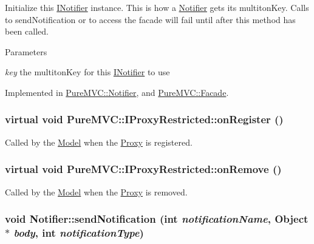 Initialize this \hyperlink{class_pure_m_v_c_1_1_i_notifier}{INotifier} instance. This is how a \hyperlink{class_pure_m_v_c_1_1_notifier}{Notifier} gets its multitonKey. Calls to sendNotification or to access the facade will fail until after this method has been called.


\begin{DoxyParams}{Parameters}
\item[{\em key}]the multitonKey for this \hyperlink{class_pure_m_v_c_1_1_i_notifier}{INotifier} to use \end{DoxyParams}


Implemented in \hyperlink{class_pure_m_v_c_1_1_notifier_a6910365c70415ba7973401215f57e4af}{PureMVC::Notifier}, and \hyperlink{class_pure_m_v_c_1_1_facade_a94c72ff29f9f42ff084f247b180fb4ad}{PureMVC::Facade}.\hypertarget{class_pure_m_v_c_1_1_i_proxy_restricted_a450f14bba0bde7c94e5868e844f1fdf2}{
\subsubsection[{onRegister}]{\setlength{\rightskip}{0pt plus 5cm}virtual void PureMVC::IProxyRestricted::onRegister ()}}
\label{class_pure_m_v_c_1_1_i_proxy_restricted_a450f14bba0bde7c94e5868e844f1fdf2}


Called by the \hyperlink{class_pure_m_v_c_1_1_model}{Model} when the \hyperlink{class_pure_m_v_c_1_1_proxy}{Proxy} is registered. \hypertarget{class_pure_m_v_c_1_1_i_proxy_restricted_a6d883fcf5a5e241321f5b5d9521ba158}{
\subsubsection[{onRemove}]{\setlength{\rightskip}{0pt plus 5cm}virtual void PureMVC::IProxyRestricted::onRemove ()}}
\label{class_pure_m_v_c_1_1_i_proxy_restricted_a6d883fcf5a5e241321f5b5d9521ba158}


Called by the \hyperlink{class_pure_m_v_c_1_1_model}{Model} when the \hyperlink{class_pure_m_v_c_1_1_proxy}{Proxy} is removed. \hypertarget{class_pure_m_v_c_1_1_notifier_a55a358ee2661ecc08400653016fdb497}{
\subsubsection[{sendNotification}]{\setlength{\rightskip}{0pt plus 5cm}void Notifier::sendNotification (int {\em notificationName}, \/  {\bf Object} $\ast$ {\em body}, \/  int {\em notificationType})}}
\label{class_pure_m_v_c_1_1_notifier_a55a358ee2661ecc08400653016fdb497}


